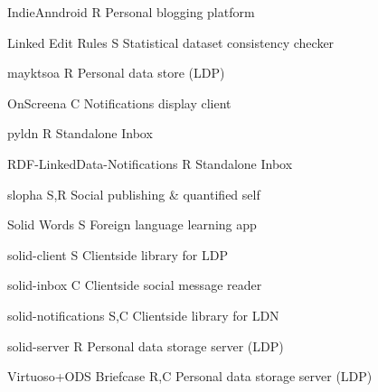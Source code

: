 \documentclass[a4paper]{llncs}
\begin{document}
                                        \empty IndieAnndroid
                                        R
                                        Personal blogging platform


                                        \empty Linked Edit Rules
                                        S
                                        Statistical dataset consistency checker


                                        \empty mayktsoa
                                        R
                                        Personal data store (LDP)


                                        \empty OnScreena
                                        C
                                        Notifications display client


                                        \empty pyldn
                                        R
                                        Standalone Inbox


                                        \empty RDF-LinkedData-Notifications
                                        R
                                        Standalone Inbox


                                        \empty slopha
                                        S,R
                                        Social publishing \& quantified self


                                        \empty Solid Words
                                        S
                                        Foreign language learning app


                                        \empty solid-client
                                        S
                                        Clientside library for LDP


                                        \empty solid-inbox
                                        C
                                        Clientside social message reader


                                        \empty solid-notifications
                                        S,C
                                        Clientside library for LDN


                                        \empty solid-server
                                        R
                                        Personal data storage server (LDP)


                                        \empty Virtuoso+\empty ODS Briefcase
                                        R,C
                                        Personal data storage server (LDP)
\end{document}
